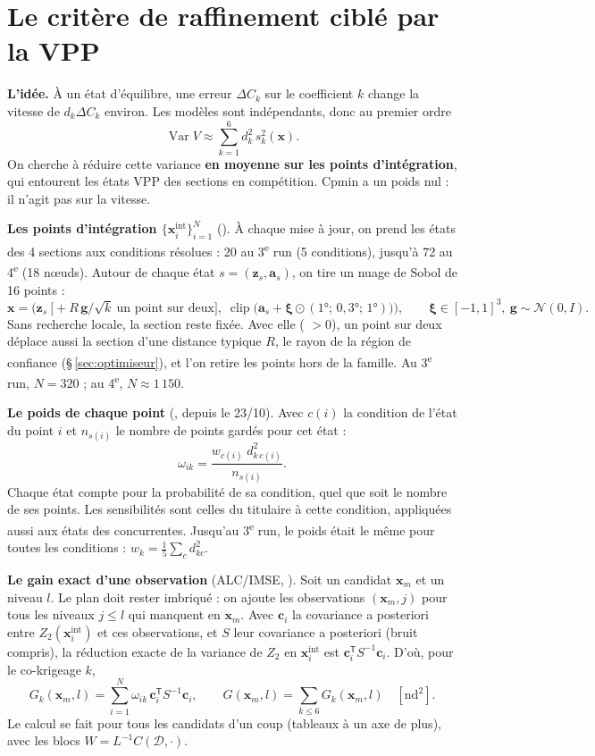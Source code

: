 \documentclass[10pt,a4paper]{article}
\newcommand{\vx}{\bm{x}}
\newcommand{\vz}{\bm{z}}
\newcommand{\va}{\bm{a}}
\newcommand{\D}{\mathcal{D}}
\newcommand{\tp}{^{\mathsf{T}}}
\DeclareMathOperator{\Var}{Var}
\begin{document}
\section{Le critère de raffinement ciblé par la VPP}
\label{sec:critere}
\textbf{L'idée.} À un état d'équilibre, une erreur $\Delta C_k$ sur le coefficient $k$ change la vitesse de
$d_k\Delta C_k$ environ. Les modèles sont indépendants, donc au premier ordre
\[
  \Var V \approx \sum_{k=1}^{6} d_k^2\, s_k^2(\vx).
\]
On cherche à réduire cette variance \textbf{en moyenne sur les points d'intégration}, qui entourent les
états VPP des sections en compétition. Cpmin a un poids nul : il n'agit pas sur la vitesse.

\textbf{Les points d'intégration $\{\vx^{\text{int}}_i\}_{i=1}^N$} (). À chaque
mise à jour, on prend les états des 4 sections aux conditions résolues : 20 au 3\textsuperscript{e} run
(5 conditions), jusqu'à 72 au 4\textsuperscript{e} (18 nœuds). Autour de chaque état $s=(\vz_s,\va_s)$, on
tire un nuage de Sobol de 16 points :
\[
  \vx=\Big(\vz_s\ \big[+R\,\bm g/\sqrt{k}\ \text{un point sur deux}\big],\;
  \operatorname{clip}\big(\va_s+\bm\xi\odot(1°;\,0{,}3°;\,1°)\big)\Big),\qquad
  \bm\xi\in[-1,1]^3,\ \bm g\sim\mathcal N(0,I).
\]
Sans recherche locale, la section reste fixée. Avec elle ( $>0$), un point sur deux
déplace aussi la section d'une distance typique $R$, le rayon de la région de confiance
(§\,\ref{sec:optimiseur}), et l'on retire les points hors de la famille. Au 3\textsuperscript{e} run,
$N=320$ ; au 4\textsuperscript{e}, $N\approx1\,150$.

\textbf{Le poids de chaque point} (, depuis le 23/10). Avec $c(i)$ la condition de l'état du
point $i$ et $n_{s(i)}$ le nombre de points gardés pour cet état :
\[
  \omega_{ik}=\frac{w_{c(i)}\;d_{k\,c(i)}^2}{n_{s(i)}} .
\]
Chaque état compte pour la probabilité de sa condition, quel que soit le nombre de ses points. Les
sensibilités sont celles du titulaire à cette condition, appliquées aussi aux états des concurrentes.
Jusqu'au 3\textsuperscript{e} run, le poids était le même pour toutes les conditions :
$w_k=\frac15\sum_c d_{kc}^2$.

\textbf{Le gain exact d'une observation} (ALC/IMSE, ). Soit un candidat $\vx_m$ et un
niveau $l$. Le plan doit rester imbriqué : on ajoute les observations $(\vx_m,j)$ pour tous les niveaux
$j\le l$ qui manquent en $\vx_m$. Avec $\bm{c}_i$ la covariance a posteriori entre $Z_2(\vx^{\text{int}}_i)$
et ces observations, et $S$ leur covariance a posteriori (bruit compris), la réduction exacte de la
variance de $Z_2$ en $\vx^{\text{int}}_i$ est $\bm{c}_i\tp S^{-1}\bm{c}_i$. D'où, pour le co-krigeage $k$,
\[
  G_k(\vx_m,l)=\sum_{i=1}^{N}\omega_{ik}\,\bm{c}_i\tp S^{-1}\bm{c}_i ,
  \qquad G(\vx_m,l)=\sum_{k\le6}G_k(\vx_m,l)\quad[\text{nd}^2].
\]
Le calcul se fait pour tous les candidats d'un coup (tableaux à un axe de plus), avec les blocs
$W=L^{-1}C(\D,\cdot)$.
\end{document}
